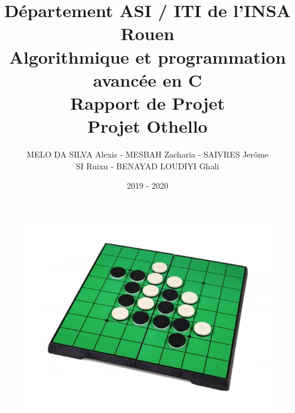 \title{Département ASI / ITI de l'INSA Rouen \\
	Algorithmique et programmation avancée en C\\
	Rapport de Projet\\
	Projet Othello}
\author{MELO DA SILVA Alexis - MESBAH Zacharia - SAIVRES Jerôme\\
SI Ruixu - BENAYAD LOUDIYI Ghali}
\date{2019 - 2020}
\maketitle
\begin{figure}[h]
	\centering
	\includegraphics[width=12cm]{./sourcesIMAGES/othello.jpg}
\end{figure}